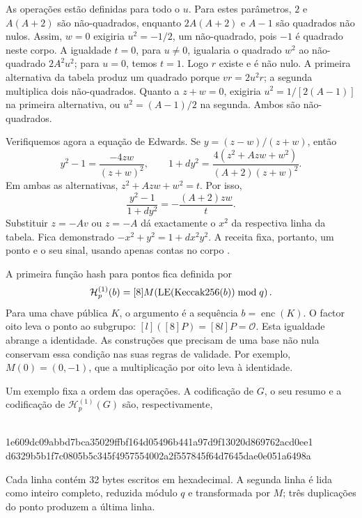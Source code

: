 As operações estão definidas para todo o \(u\). Para estes parâmetros,
\(2\) e \(A(A+2)\) são não-quadrados, enquanto \(2A(A+2)\) e \(A-1\)
são quadrados não nulos. Assim, \(w=0\) exigiria
\(u^2=-1/2\), um não-quadrado, pois \(-1\) é quadrado neste corpo.
A igualdade \(t=0\), para \(u\ne0\), igualaria o quadrado \(w^2\)
ao não-quadrado \(2A^2u^2\); para \(u=0\), temos \(t=1\).
Logo \(r\) existe e é não nulo. A primeira alternativa da tabela
produz um quadrado porque \(vr=2u^2r\); a segunda multiplica dois
não-quadrados. Quanto a \(z+w=0\), exigiria
\(u^2=1/[2(A-1)]\) na primeira alternativa, ou
\(u^2=(A-1)/2\) na segunda. Ambos são não-quadrados.

Verifiquemos agora a equação de Edwards. Se \(y=(z-w)/(z+w)\), então
\[
 y^2-1=\frac{-4zw}{(z+w)^2},\qquad
 1+dy^2=\frac{4(z^2+Azw+w^2)}{(A+2)(z+w)^2}.
\]
Em ambas as alternativas, \(z^2+Azw+w^2=t\). Por isso,
\[
 \frac{y^2-1}{1+dy^2}
      =-\frac{(A+2)zw}{t}.
\]
Substituir \(z=-Av\) ou \(z=-A\) dá exactamente o \(x^2\) da
respectiva linha da tabela. Fica demonstrado
\(-x^2+y^2=1+dx^2y^2\). A receita fixa, portanto, um ponto e o
seu sinal, usando apenas contas no corpo
\cite{monero-point-maps,hashtopoint-writeup}.

A primeira função hash para pontos fica definida por
\begin{equation}
 \mathcal H_p^{(1)}(b)
   =[8]M\!\left(\operatorname{LE}(\operatorname{Keccak256}(b))
                                      \bmod q\right).
 \label{eq:hash-to-point-one}
\index{h p 1@\(\mathcal H_p^{(1)}\), receita por Keccak}
\end{equation}
Para uma chave pública \(K\), o argumento é a sequência
\(b=\operatorname{enc}(K)\). O factor oito leva o ponto ao subgrupo:
\([l]([8]P)=[8l]P=\mathcal O\).
Esta igualdade abrange a identidade. As construções que precisam de
uma base não nula conservam essa condição nas suas regras de validade.
Por exemplo, \(M(0)=(0,-1)\), que a multiplicação por oito leva à
identidade.

Um exemplo fixa a ordem das operações. A codificação de \(G\), o
seu resumo e a codificação de \(\mathcal H_p^{(1)}(G)\) são,
respectivamente,
\begin{center}
\small{}\\
1e609dc09abbd7bca35029ffbf164d05496b441a97d9f13020d869762acd0ee1\\
d6329b5b1f7c0805b5c345f4957554002a2f557845f64d7645dae0e051a6498a
\end{center}
Cada linha contém 32 bytes escritos em hexadecimal. A segunda linha
é lida como inteiro completo, reduzida módulo \(q\) e transformada por
\(M\); três duplicações do ponto produzem a última linha.

